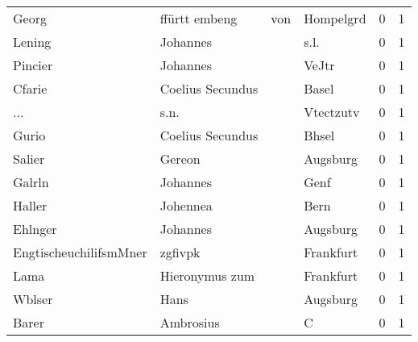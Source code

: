 \documentclass[10pt,a4paper,landscape]{article}
\begin{document}
\begin{longtable}{llllrr}
                    Georg &                      ffürtt embeng &         von &                                   Hompelgrd &          0 &         1 \\
                   Lening &                           Johannes &             &                                        s.l. &          0 &         1 \\
                  Pincier &                           Johannes &             &                                       VeJtr &          0 &         1 \\
                   Cfarie &                   Coelius Secundus &             &                                       Basel &          0 &         1 \\
                      ... &                               s.n. &             &                                   Vtectzutv &          0 &         1 \\
                    Gurio &                   Coelius Secundus &             &                                       Bhsel &          0 &         1 \\
                   Salier &                             Gereon &             &                                    Augsburg &          0 &         1 \\
                   Galrln &                           Johannes &             &                                        Genf &          0 &         1 \\
                   Haller &                           Johennea &             &                                        Bern &          0 &         1 \\
                  Ehlnger &                           Johannes &             &                                    Augsburg &          0 &         1 \\
   EngtischeuchilifsmMner &                            zgfivpk &             &                                   Frankfurt &          0 &         1 \\
                     Lama &                     Hieronymus zum &             &                                   Frankfurt &          0 &         1 \\
                   Wblser &                               Hans &             &                                    Augsburg &          0 &         1 \\
                    Barer &                          Ambrosius &             &                                           C &          0 &         1 \\

\end{longtable}
\end{document}
